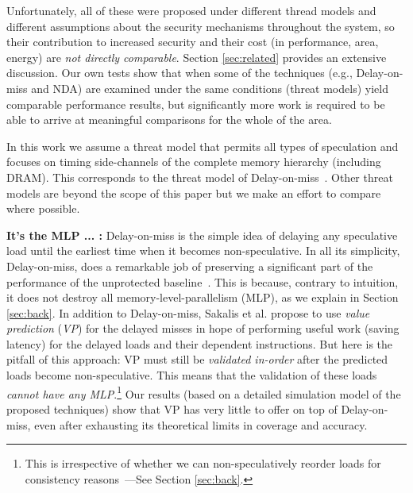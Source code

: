 Unfortunately, all of these were proposed under different thread models and different assumptions about the security mechanisms throughout the system, so their contribution to increased security and their cost (in performance, area, energy) are \emph{not directly comparable}. Section \ref{sec:related} provides an extensive discussion. Our own tests show that when some of the techniques (e.g., Delay-on-miss and NDA) are examined under the same conditions (threat models) yield comparable performance results, but significantly more work is required to be able to arrive at meaningful comparisons for the whole of the area.

In this work we assume a threat model that permits all types of speculation and focuses on timing side-channels of the complete memory hierarchy (including DRAM). This corresponds to the threat model of 
Delay-on-miss~\cite{sakalis2019efficient}. Other threat models are beyond the scope of this paper {\color{red} but we make an effort to compare where possible}. %

\noindent \textbf{It's the MLP ... :} Delay-on-miss is the simple idea of delaying any speculative load until the earliest time when it becomes non-speculative. In all its simplicity, Delay-on-miss, does a remarkable job of preserving a significant part of the performance of the unprotected baseline~\cite{sakalis2019efficient}. This is because, contrary to intuition, it does not destroy all memory-level-parallelism (MLP), as we explain in Section \ref{sec:back}.
In addition to Delay-on-miss, Sakalis et al. propose to use \emph{value prediction} (\emph{VP}) for the delayed misses in hope of performing useful work (saving latency) for the delayed loads and their dependent instructions. But here is the pitfall of this approach: VP must still be \emph{validated in-order} after the predicted loads become non-speculative. This means that the validation of these loads \emph{cannot have any MLP}.\footnote{This is irrespective of whether we can non-speculatively reorder loads for consistency reasons~\cite{aros-isca17}---See Section \ref{sec:back}.} {\color{red} Our results (based on a detailed simulation model of the proposed techniques) show that VP has very little to offer on top of Delay-on-miss, even after exhausting its theoretical limits in coverage and accuracy.}

